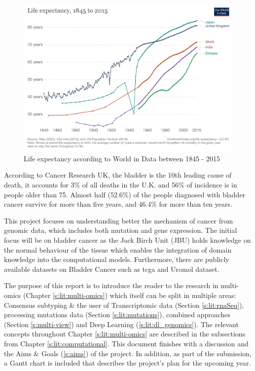 \begin{figure}[!htb]
    \centering\includegraphics[width=1.0\textwidth,height=0.3\textheight,keepaspectratio]{Images/life-expectancy.png}
      \caption{Life expectancy according to World in Data between 1845 - 2015\cite{World_in_Data_undated-no}}
      \label{fig:life_expectancy}
  \end{figure}
  \FloatBarrier

According to Cancer Research UK\cite{Cancer_Research_UK2015-cf}, the bladder is the 10th leading cause of death, it accounts for 3\% of all deaths in the U.K. and 56\% of incidence is in people older than 75. Almost half (52.6\%) of the people diagnosed with bladder cancer survive for more than five years, and 46.4\% for more than ten years. 

This project focuses on understanding better the mechanism of cancer from genomic data, which includes both mutation and gene expression. The initial focus will be on bladder cancer as the Jack Birch Unit (JBU) holds knowledge on the normal behaviour of the tissue which enables the integration of domain knowledge into the computational models. Furthermore, there are publicly available datasets on Bladder Cancer such as \acrfull{tcga}\cite{Tcga2018-sj} and Uromol dataset\cite{Lindskrog2021-ov, The_European_Genome-phenome_Archive_undated-pz}.

The purpose of this report is to introduce the reader to the research in multi-omics (Chapter \ref{s:lit:multi-omics}) which itself can be split in multiple areas: Consensus subtyping \& the user of Transcriptomic data (Section \ref{s:lit:rnaSeq}), processing mutations data (Section \ref{s:lit:mutations}), combined approaches (Section \ref{s:multi-view}) and Deep Learning (\ref{s:lit:dl_genomics}). The relevant concepts throughout  Chapter \ref{s:lit:multi-omics} are described in the subsections from Chapter \ref{s:lit:computational}. This document finishes with a discussion and the Aims \& Goals (\ref{s:aims}) of the project. In addition, as part of the submission, a Gantt chart is included that describes the project's plan for the upcoming year. 

